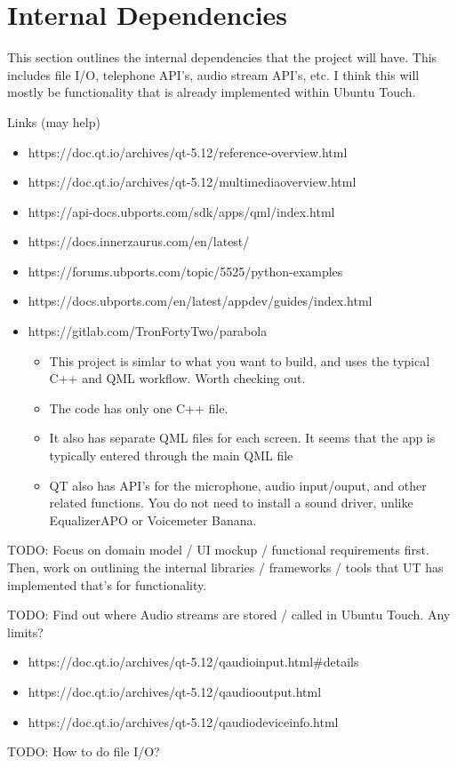 \section{Internal Dependencies}

This section outlines the internal dependencies that the project will have. This includes file I/O, telephone API's, audio stream API's, etc. I think this will mostly be functionality that is already implemented within Ubuntu Touch.

Links (may help)
\begin{itemize}
	\item https://doc.qt.io/archives/qt-5.12/reference-overview.html
	\item https://doc.qt.io/archives/qt-5.12/multimediaoverview.html
	\item https://api-docs.ubports.com/sdk/apps/qml/index.html
	\item https://docs.innerzaurus.com/en/latest/
	\item https://forums.ubports.com/topic/5525/python-examples
	\item https://docs.ubports.com/en/latest/appdev/guides/index.html
	\item https://gitlab.com/TronFortyTwo/parabola
	\begin{itemize}
		\item This project is simlar to what you want to build, and uses the typical C++ and QML workflow. Worth checking out.
		\item The code has only one C++ file.
		\item It also has separate QML files for each screen. It seems that the app is typically entered through the main QML file
		\item QT also has API's for the microphone, audio input/ouput, and other related functions. You do not need to install a sound driver, unlike EqualizerAPO or Voicemeter Banana.
	\end{itemize}
\end{itemize}


TODO: Focus on domain model / UI mockup / functional requirements first. Then, work on outlining the internal libraries / frameworks / tools that UT has implemented that's for functionality.

TODO: Find out where Audio streams are stored / called in Ubuntu Touch. Any limits?
\begin{itemize}
	\item https://doc.qt.io/archives/qt-5.12/qaudioinput.html\#details
	\item https://doc.qt.io/archives/qt-5.12/qaudiooutput.html
	\item https://doc.qt.io/archives/qt-5.12/qaudiodeviceinfo.html
\end{itemize}


TODO: How to do file I/O?

